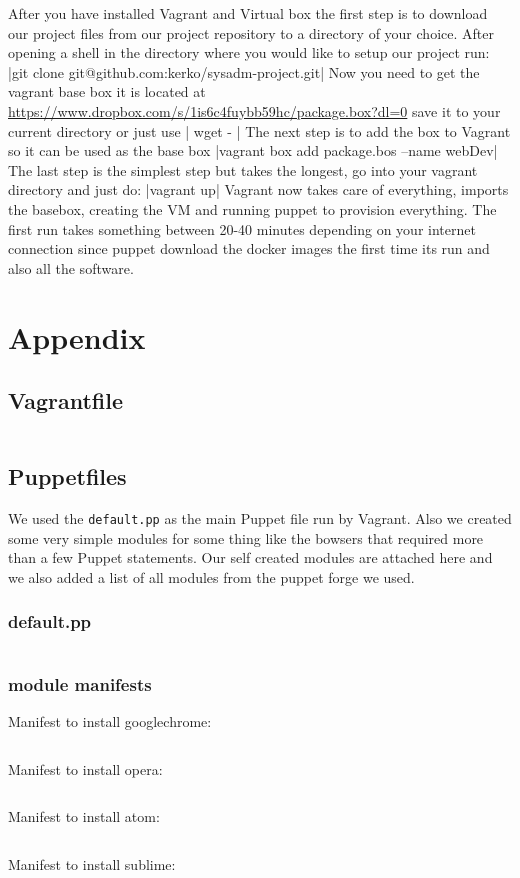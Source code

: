 After you have installed Vagrant and Virtual box the first step is to download our project files from our project repository to a directory of your choice. After opening a shell in the directory where you would like to setup our project run: |git clone git@github.com:kerko/sysadm-project.git|
Now you need to get the vagrant base box it is located at \url{https://www.dropbox.com/s/1is6c4fuybb59hc/package.box?dl=0} save it to your current directory or just use | wget - |
The next step is to add the box to Vagrant so it can be used as the base box |vagrant box add package.bos --name webDev| The last step is the simplest step but takes the longest, go into your vagrant directory and just do: |vagrant up| Vagrant now takes care of everything, imports the basebox, creating the \gls{VM} and running puppet to provision everything. The first run takes something between 20-40 minutes depending on your internet connection since puppet download the docker images the first time its run and also all the software.



\cleardoublepage{}
\section{Appendix}
\subsection{Vagrantfile}
\inputminted[linenos=true]{ruby}{../../vagrant/Vagrantfile}
\subsection{Puppetfiles}
We used the  \verb|default.pp| as the main Puppet file run by Vagrant. Also we created some very simple modules for some thing like the bowsers that required more than a few Puppet statements. Our self created modules are attached here and we also added a list of all modules from the puppet forge we used.
\subsubsection{default.pp}
\inputminted[linenos=true]{puppet}{../../puppet/manifests/default.pp}
\subsubsection{module manifests}
Manifest to install googlechrome:
\inputminted[linenos=true]{puppet}{../../puppet/modules/googlechrome/manifests/init.pp}
Manifest to install opera:
\inputminted[linenos=true]{puppet}{../../puppet/modules/opera/manifests/init.pp}
Manifest to install atom:
\inputminted[linenos=true]{puppet}{../../puppet/modules/atom/manifests/init.pp}
Manifest to install sublime:
\inputminted[linenos=true]{puppet}{../../puppet/modules/sublime/manifests/init.pp}


